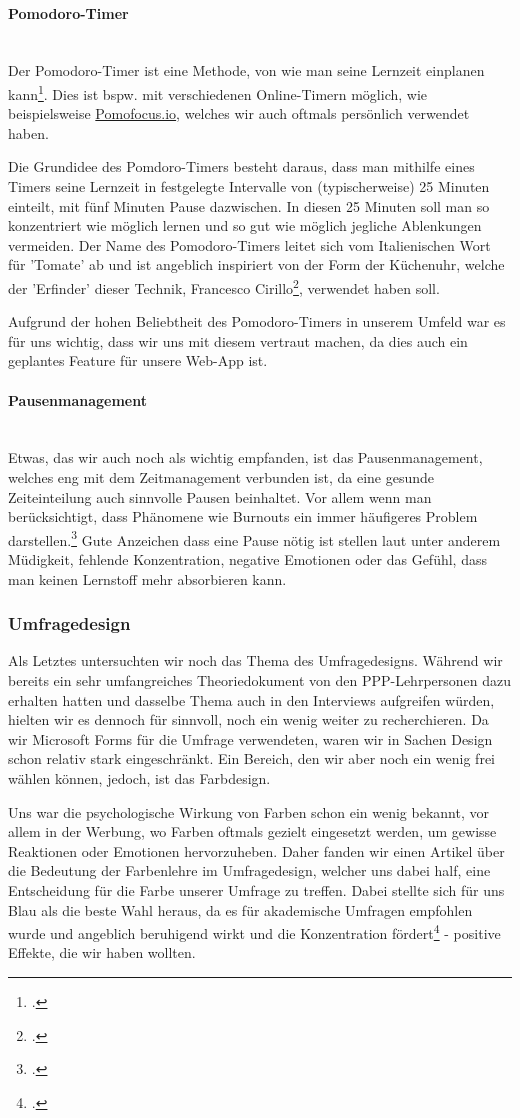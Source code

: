 \documentclass[12pt,a4paper]{report}
\newcommand{\myparagraph}[1]{\paragraph{#1}\mbox{}\\}
\begin{document}
\myparagraph{Pomodoro-Timer}
Der Pomodoro-Timer ist eine Methode, von wie man seine Lernzeit einplanen kann\footcite{Pomodoro}.
Dies ist bspw. mit verschiedenen Online-Timern möglich, wie beispielsweise \href{https://pomofocus.io/}{Pomofocus.io}, welches wir auch oftmals persönlich verwendet haben.

Die Grundidee des Pomdoro-Timers besteht daraus, dass man mithilfe eines Timers seine Lernzeit in festgelegte Intervalle von (typischerweise) 25 Minuten einteilt, mit fünf Minuten Pause dazwischen.
In diesen 25 Minuten soll man so konzentriert wie möglich lernen und so gut wie möglich jegliche Ablenkungen vermeiden. Der Name des Pomodoro-Timers leitet sich vom Italienischen Wort für 'Tomate' ab und ist angeblich inspiriert von der Form der Küchenuhr, welche der 'Erfinder' dieser Technik, Francesco Cirillo\footcite{Pomodoro}, verwendet haben soll.

Aufgrund der hohen Beliebtheit des Pomodoro-Timers in unserem Umfeld war es für uns wichtig, dass wir uns mit diesem vertraut machen, da dies auch ein geplantes Feature für unsere Web-App ist.

\myparagraph{Pausenmanagement}
Etwas, das wir auch noch als wichtig empfanden, ist das Pausenmanagement, welches eng mit dem Zeitmanagement verbunden ist, da eine gesunde Zeiteinteilung auch sinnvolle Pausen beinhaltet.
Vor allem wenn man berücksichtigt, dass Phänomene wie Burnouts ein immer häufigeres Problem darstellen.\footcite{Burnout}
Gute Anzeichen dass eine Pause nötig ist stellen laut \textcite{Pausenmanagement} unter anderem Müdigkeit, fehlende Konzentration, negative Emotionen oder das Gefühl, dass man keinen Lernstoff mehr absorbieren kann.

\subsubsection{Umfragedesign}
Als Letztes untersuchten wir noch das Thema des Umfragedesigns. 
Während wir bereits ein sehr umfangreiches Theoriedokument von den PPP-Lehrpersonen dazu erhalten hatten und dasselbe Thema auch in den Interviews aufgreifen würden, hielten wir es dennoch für sinnvoll, noch ein wenig weiter zu recherchieren.
Da wir Microsoft Forms für die Umfrage verwendeten, waren wir in Sachen Design schon relativ stark eingeschränkt. 
Ein Bereich, den wir aber noch ein wenig frei wählen können, jedoch, ist das Farbdesign.

Uns war die psychologische Wirkung von Farben schon ein wenig bekannt, vor allem in der Werbung, wo Farben oftmals gezielt eingesetzt werden, um gewisse Reaktionen oder Emotionen hervorzuheben.
Daher fanden wir einen Artikel über die Bedeutung der Farbenlehre im Umfragedesign, welcher uns dabei half, eine Entscheidung für die Farbe unserer Umfrage zu treffen.
Dabei stellte sich für uns Blau als die beste Wahl heraus, da es für akademische Umfragen empfohlen wurde und angeblich beruhigend wirkt und die Konzentration fördert\footcite{ColorPsychology} - positive Effekte, die wir haben wollten. 
\end{document}
